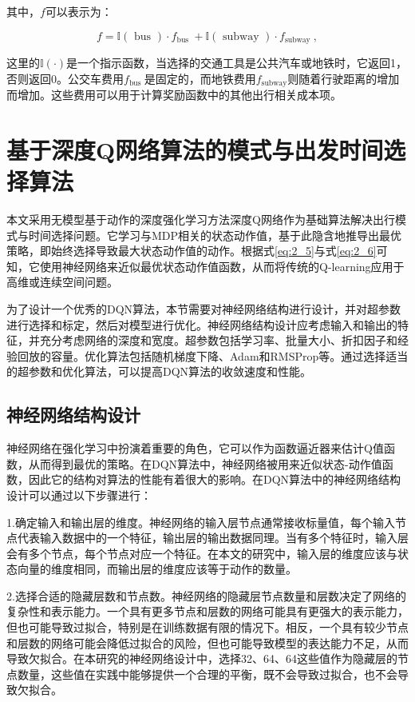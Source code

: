 其中，$f$可以表示为：

\begin{equation}
f=\mathbb{I}(\text { bus }) \cdot f_{\text {bus }}+\mathbb{I}(\text { subway }) \cdot f_{\text {subway }},
\end{equation}

这里的$\mathbb{I}(\cdot)$是一个指示函数，当选择的交通工具是公共汽车或地铁时，它返回1，否则返回0。公交车费用$f_{\text {bus }}$是固定的，而地铁费用$f_{\text {subway} }$则随着行驶距离的增加而增加。这些费用可以用于计算奖励函数中的其他出行相关成本项。

\section{基于深度Q网络算法的模式与出发时间选择算法}

本文采用无模型基于动作的深度强化学习方法深度Q网络作为基础算法解决出行模式与时间选择问题。它学习与MDP相关的状态动作值，基于此隐含地推导出最优策略，即始终选择导致最大状态动作值的动作。根据式\ref{eq:2_5}与式\ref{eq:2_6}可知，它使用神经网络来近似最优状态动作值函数，从而将传统的Q-learning应用于高维或连续空间问题。

为了设计一个优秀的DQN算法，本节需要对神经网络结构进行设计，并对超参数进行选择和标定，然后对模型进行优化。神经网络结构设计应考虑输入和输出的特征，并充分考虑网络的深度和宽度。超参数包括学习率、批量大小、折扣因子和经验回放的容量。优化算法包括随机梯度下降、Adam和RMSProp等。通过选择适当的超参数和优化算法，可以提高DQN算法的收敛速度和性能。

\subsection{神经网络结构设计}


神经网络在强化学习中扮演着重要的角色，它可以作为函数逼近器来估计Q值函数，从而得到最优的策略。在DQN算法中，神经网络被用来近似状态-动作值函数，因此它的结构对算法的性能有着很大的影响。在DQN算法中的神经网络结构设计可以通过以下步骤进行：

1.确定输入和输出层的维度。神经网络的输入层节点通常接收标量值，每个输入节点代表输入数据中的一个特征，输出层的输出数据同理。当有多个特征时，输入层会有多个节点，每个节点对应一个特征。在本文的研究中，输入层的维度应该与状态向量的维度相同，而输出层的维度应该等于动作的数量。

2.选择合适的隐藏层数和节点数。神经网络的隐藏层节点数量和层数决定了网络的复杂性和表示能力。一个具有更多节点和层数的网络可能具有更强大的表示能力，但也可能导致过拟合，特别是在训练数据有限的情况下。相反，一个具有较少节点和层数的网络可能会降低过拟合的风险，但也可能导致模型的表达能力不足，从而导致欠拟合。在本研究的神经网络设计中，选择32、64、64这些值作为隐藏层的节点数量，这些值在实践中能够提供一个合理的平衡，既不会导致过拟合，也不会导致欠拟合。

